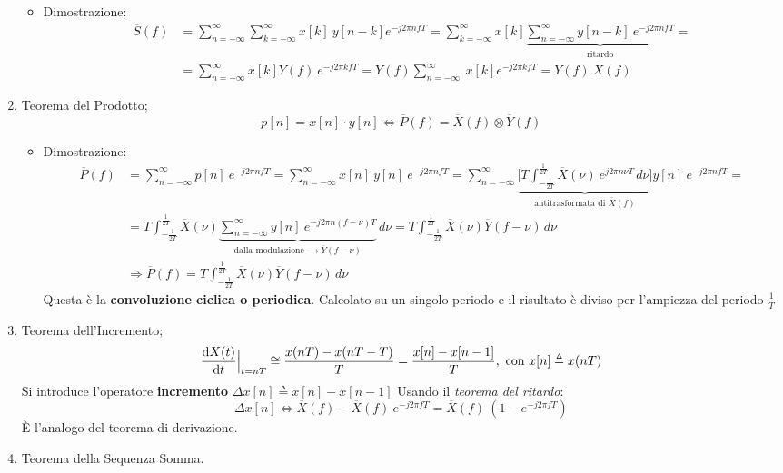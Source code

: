 \documentclass[
]{article}
\providecommand{\tightlist}{%
  \setlength{\itemsep}{0pt}\setlength{\parskip}{0pt}}
\begin{document}
\begin{enumerate}
  \begin{itemize}
  \tightlist
  \item
    Dimostrazione: \begin{align*}
     \overline{S}(f) &= \sum_{n=-\infty}^{\infty} \sum_{k=-\infty}^{\infty} x[k]\ y[n-k] e^{-j2\pi nfT} = \sum_{k=-\infty}^{\infty} x[k] \underbrace{\sum_{n=-\infty}^{\infty}y[n-k]\ e^{-j2\pi nfT}}_{\text{ritardo}}= \\
     &= \sum_{n=-\infty}^{\infty} x[k] \overline{Y}(f) \ e^{-j2\pi kfT} = \overline{Y}(f)  \sum_{n=-\infty}^{\infty} \ x[k]  e^{-j2\pi kfT} =\overline{Y}(f) \ \overline{X}(f)
     \end{align*}
  \end{itemize}
\item
  Teorema del Prodotto; \[
   p[n]=x[n]\cdot y[n] \Longleftrightarrow \overline{P}(f) = \overline{X}(f) \otimes \overline{Y}(f)
   \]

  \begin{itemize}
  \tightlist
  \item
    Dimostrazione: \begin{align*}
      \overline{P}(f)&=\sum_{n=-\infty}^{\infty} p[n] \ e^{-j2\pi nfT} =  \sum_{n=-\infty}^{\infty} x[n] \ y[n] \ e^{-j2\pi nfT} = \sum_{n=-\infty}^{\infty}
      \underbrace{\Big[T\int_{-\frac{1}{2T}}^{\frac{1}{2T}} \overline{X}(\nu)\ e^{j2\pi n\nu T} \,d\nu\Big]}_{\text{antitrasformata di }\overline{X}(f)} y[n] \ e^{-j2\pi nfT} = \\
      &= T \int_{-\frac{1}{2T}}^{\frac{1}{2T}} \overline{X}(\nu)  \underbrace{\sum_{n=-\infty}^{\infty} y[n] \ e^{-j2\pi n(f-\nu)T}}_{\text{dalla modulazione }\to \overline{Y}(f-\nu)} \,d\nu=
      T \int_{-\frac{1}{2T}}^{\frac{1}{2T}} \overline{X}(\nu) \overline{Y}(f-\nu)\,d\nu  \\
     &\Rightarrow \overline{P}(f) = T \int_{-\frac{1}{2T}}^{\frac{1}{2T}} \overline{X}(\nu) \overline{Y}(f-\nu)\,d\nu
     \end{align*} Questa è la \textbf{convoluzione ciclica o periodica}.
    Calcolato su un singolo periodo e il risultato è diviso per
    l'ampiezza del periodo \(\frac{1}{T}\)
  \end{itemize}
\item
  Teorema dell'Incremento; \[
   \odv{X(t)}{t}\Big|_{t=nT} \cong \frac{x(nT)-x(nT-T)}{T} = \frac{x[n]-x[n-1]}{T}, \text{ con } x[n] \triangleq x(nT)  
   \] Si introduce l'operatore \textbf{incremento}
  \(\Delta x[n] \triangleq x[n] - x[n-1]\) \newline Usando il
  \emph{teorema del ritardo}: \[
   \Delta x[n] \Longleftrightarrow \overline{X}(f) - \overline{X}(f)\ e^{-j2\pi fT} = \overline{X}(f) \ (1-e^{-j2\pi fT})
   \] È l'analogo del teorema di derivazione.
\item
  Teorema della Sequenza Somma.


\end{enumerate}
\end{document}
